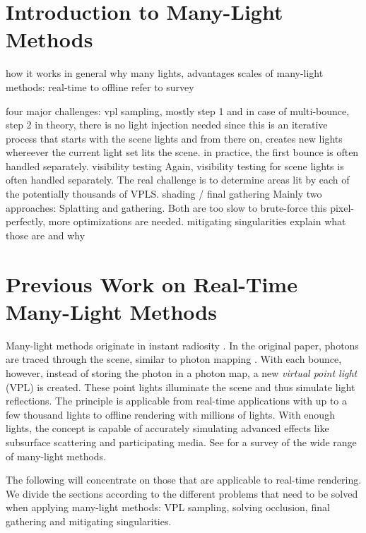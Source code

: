 \section{Introduction to Many-Light Methods}

\begin{outline}
\1 how it works in general
\1 why many lights, advantages
\1 scales of many-light methods: real-time to offline
\1 refer to survey \cite{Dachsbacher:2014:ManyLightsSTAR}

\1 four major challenges:
    \2 vpl sampling, mostly step 1 and in case of multi-bounce, step 2
        \3 in theory, there is no light injection needed since this is an iterative process that starts with the scene lights and from there on, creates new lights whereever the current light set lits the scene. in practice, the first bounce is often handled separately.
    \2 visibility testing
        \3 Again, visibility testing for scene lights is often handled separately. The real challenge is to determine areas lit by each of the potentially thousands of VPLS.
    \2 shading / final gathering
        \3 Mainly two approaches: Splatting and gathering. Both are too slow to brute-force this pixel-perfectly, more optimizations are needed.
    \2 mitigating singularities
        \3 explain what those are and why

\end{outline}

\section{Previous Work on Real-Time Many-Light Methods}

Many-light methods originate in instant radiosity \citep{Keller:1997:InstantRadiosity}. In the original paper, photons are traced through the scene, similar to photon mapping \citep{Jensen:1996:PhotonMapping}. With each bounce, however, instead of storing the photon in a photon map, a new \emph{virtual point light} (VPL) is created. These point lights illuminate the scene and thus simulate light reflections. The principle is applicable from real-time applications with up to a few thousand lights to offline rendering with millions of lights. With enough lights, the concept is capable of accurately simulating advanced effects like subsurface scattering and participating media. See \citet{Dachsbacher:2014:ManyLightsSTAR} for a survey of the wide range of many-light methods.

The following will concentrate on those that are applicable to real-time rendering. We divide the sections according to the different problems that need to be solved when applying many-light methods: VPL sampling, solving occlusion, final gathering and mitigating singularities.

